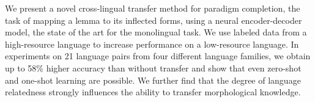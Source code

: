We present a novel cross-lingual transfer method for paradigm completion, the task of mapping a lemma to its inflected forms, using a neural encoder-decoder model, the state of the art for the monolingual task. We use labeled data from a high-resource language to increase performance on a low-resource language. In experiments on 21 language pairs from four different language families, we obtain up to 58\% higher accuracy than without transfer and show that even zero-shot and one-shot learning are possible. We further find that the degree of language relatedness strongly influences the ability to transfer morphological knowledge.
